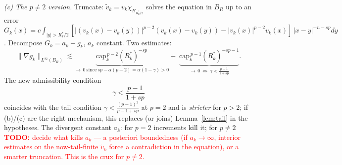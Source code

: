 \documentclass[11pt]{amsart}
\theoremstyle{plain}
\theoremstyle{definition}
\theoremstyle{remark}
\newcommand{\Jp}[1]{|#1|^{p-2}#1}                  %
\newcommand{\al}{\alpha}
\newcommand{\TODO}[1]{\textcolor{red}{\textbf{TODO:} #1}}
\begin{document}
\emph{(c) The $p\neq2$ version.} Truncate: $\tilde v_k=v_k\chi_{B_{R^*_k/2}}$
solves the equation in $B_R$ up to an error
$G_k(x)=c\int_{|y|>R^*_k/2}[\Jp{(v_k(x)-v_k(y))}-\Jp{v_k(x)}]\,|x-y|^{-n-sp}dy$.
Decompose $G_k=a_k+g_k$, $a_k$ constant. Two estimates:
\[
  \|\nabla g_k\|_{L^\infty(B_R)}
  \lesssim
  \underbrace{\mathrm{cap}_k^{\,p-2}(R^*_k)^{-sp}}_{\to\,0\ \text{since}\ sp-\al(p-2)=\al(1-\gamma)>0}
  +\;
  \underbrace{\mathrm{cap}_k^{\,p-1}(R^*_k)^{-sp-1}}_{\to\,0\ \iff\ \gamma<\frac{p-1}{1+sp}} .
\]
The new admissibility condition
\[
  \boxed{\;\gamma<\frac{p-1}{1+sp}\;}
\]
coincides with the tail condition $\gamma<\frac{(p-1)^2}{p-1+sp}$ at
$p=2$ and is \emph{stricter} for $p>2$; if (b)/(c) are the right
mechanism, this replaces (or joins) Lemma~\ref{lem:tail} in the
hypotheses. The divergent constant $a_k$: for $p=2$ increments kill it;
for $p\neq2$ \TODO{decide what kills $a_k$ --- a posteriori boundedness
(if $a_k\to\infty$, interior estimates on the now-tail-finite
$\tilde v_k$ force a contradiction in the equation), or a smarter
truncation. This is the crux for $p\neq2$.}
\end{document}
